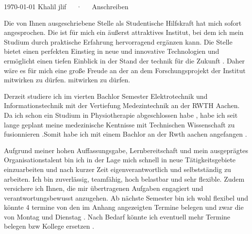 \documentclass[12pt, a4paper]{awesome-cv}
\begin{document}
\makecvheader[R]
\vskip 1cm
\makecvfooter
  {\today}
  {Khalil jlif~~~·~~~Anschreiben}
  {}

\makelettertitle

\begin{cvletter}
\vskip 1cm
\normalsize {Die von Ihnen ausgeschriebene Stelle als Studentische Hilfskraft hat mich sofort
angesprochen. Die  \institute  \space ist
für mich ein äußerst attraktives Institut, bei dem ich mein Studium durch praktische
Erfahrung hervorragend ergänzen kann. Die Stelle bietet einen perfekten Einstieg in neue und innovative Technologien und ermöglicht einen tiefen Einblick in der Stand der technik für die Zukunft . Daher wäre es für
mich eine große Freude an der an dem Forschungsprojekt der Institut mitwirken zu dürfen. mitwirken zu dürfen.


Derzeit studiere ich im vierten Bachlor Semester Elektrotechnik und Informationstechnik mit der Vertiefung
Medezintechnik an der RWTH Aachen.
Da ich schon ein Studium in Physiotherapie abgeschlossen habe , habe ich seit lange geplant  meine medezinische Kentnisse mit Technischen Wissenschaft zu fusionnieren .Somit habe ich mit einem Bachlor   an der Rwth aachen angefangen . 




Aufgrund meiner hohen Auffassungsgabe, Lernbereitschaft und mein ausgeprägtes
Organisationstalent bin ich in der Lage mich schnell in neue Tätigkeitsgebiete einzuarbeiten
und nach kurzer Zeit eigenverantwortlich und selbstständig zu arbeiten. Ich bin zuverlässig,
teamfähig, hoch belastbar und sehr flexible.
Zudem versichere ich Ihnen, die mir übertragenen Aufgaben engagiert und
verantwortungsbewusst anzugehen.
Ab nächste Semester bin ich wohl flexibel und könnte 4 termine von den im Anhang angezeigten Termine belegen und zwar die von Montag und Dienstag . Nach Bedarf könnte ich eventuell mehr Termine belegen bzw Kollege ersetzen . 
}
\end{cvletter}


\makeletterclosing
\end{document}
